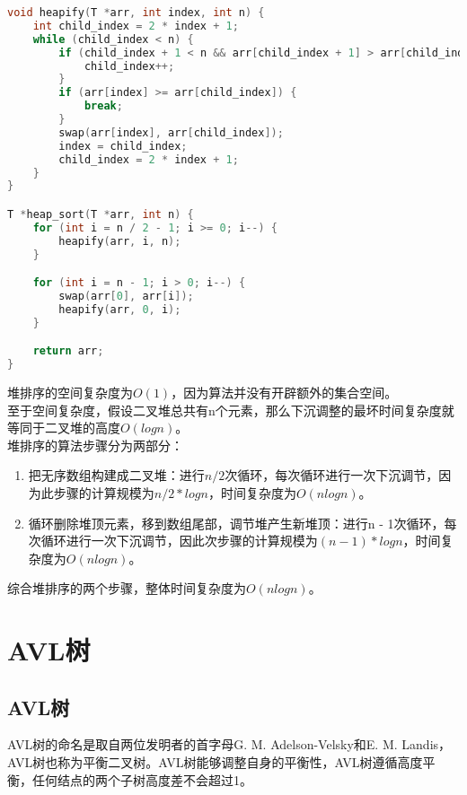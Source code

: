 \vspace{0.5cm}


\begin{lstlisting}[language=C]
void heapify(T *arr, int index, int n) {
	int child_index = 2 * index + 1;
	while (child_index < n) {
		if (child_index + 1 < n && arr[child_index + 1] > arr[child_index]) {
			child_index++;
		}
		if (arr[index] >= arr[child_index]) {
			break;
		}
		swap(arr[index], arr[child_index]);
		index = child_index;
		child_index = 2 * index + 1;
	}
}

T *heap_sort(T *arr, int n) {
	for (int i = n / 2 - 1; i >= 0; i--) {
		heapify(arr, i, n);
	}

	for (int i = n - 1; i > 0; i--) {
		swap(arr[0], arr[i]);
		heapify(arr, 0, i);
	}

	return arr;
}
\end{lstlisting}

堆排序的空间复杂度为$ O(1) $，因为算法并没有开辟额外的集合空间。\\

至于空间复杂度，假设二叉堆总共有n个元素，那么下沉调整的最坏时间复杂度就等同于二叉堆的高度$ O(logn) $。\\

堆排序的算法步骤分为两部分：

\begin{enumerate}
	\item 把无序数组构建成二叉堆：进行$ n / 2 $次循环，每次循环进行一次下沉调节，因为此步骤的计算规模为$ n/2 * logn $，时间复杂度为$ O(nlogn) $。

	\item 循环删除堆顶元素，移到数组尾部，调节堆产生新堆顶：进行n - 1次循环，每次循环进行一次下沉调节，因此次步骤的计算规模为$ (n-1) * logn $，时间复杂度为$ O(nlogn) $。
\end{enumerate}

综合堆排序的两个步骤，整体时间复杂度为$ O(nlogn) $。

\newpage

\section{AVL树}

\subsection{AVL树}

AVL树的命名是取自两位发明者的首字母G. M. Adelson-Velsky和E. M. Landis，AVL树也称为平衡二叉树。AVL树能够调整自身的平衡性，AVL树遵循高度平衡，任何结点的两个子树高度差不会超过1。\\

